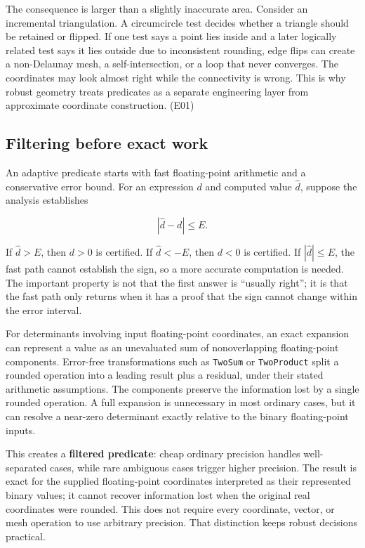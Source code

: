 The consequence is larger than a slightly inaccurate area. Consider an incremental triangulation. A circumcircle test decides whether a triangle should be retained or flipped. If one test says a point lies inside and a later logically related test says it lies outside due to inconsistent rounding, edge flips can create a non-Delaunay mesh, a self-intersection, or a loop that never converges. The coordinates may look almost right while the connectivity is wrong. This is why robust geometry treats predicates as a separate engineering layer from approximate coordinate construction. (E01)

\subsection{Filtering before exact work}\label{02-foundations-ii-ch034-filtering-before-exact-work}

An adaptive predicate starts with fast floating-point arithmetic and a conservative error bound. For an expression \(d\) and computed value \(\widehat d\), suppose the analysis establishes

\[
|\widehat d-d|\le E.
\]

If \(\widehat d>E\), then \(d>0\) is certified. If \(\widehat d<-E\), then \(d<0\) is certified. If \(|\widehat d|\le E\), the fast path cannot establish the sign, so a more accurate computation is needed. The important property is not that the first answer is ``usually right''; it is that the fast path only returns when it has a proof that the sign cannot change within the error interval.

For determinants involving input floating-point coordinates, an exact expansion can represent a value as an unevaluated sum of nonoverlapping floating-point components. Error-free transformations such as \texttt{TwoSum} or \texttt{TwoProduct} split a rounded operation into a leading result plus a residual, under their stated arithmetic assumptions. The components preserve the information lost by a single rounded operation. A full expansion is unnecessary in most ordinary cases, but it can resolve a near-zero determinant exactly relative to the binary floating-point inputs.

This creates a \textbf{filtered predicate}: cheap ordinary precision handles well-separated cases, while rare ambiguous cases trigger higher precision. The result is exact for the supplied floating-point coordinates interpreted as their represented binary values; it cannot recover information lost when the original real coordinates were rounded. This does not require every coordinate, vector, or mesh operation to use arbitrary precision. That distinction keeps robust decisions practical.

